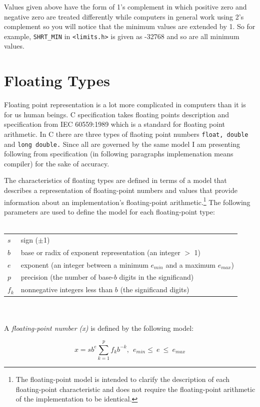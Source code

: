 Values given above have the form of 1's complement in which positive zero and
negative zero are treated differently while computers in general work using 2's
complement so you will notice that the minimum values are extended by 1. So for
example, \texttt{SHRT\_MIN} in \texttt{<limits.h>} is given as -32768 and so
are all minimum values.

\section{Floating Types}
Floating point representation is a lot more complicated in computers than it
is for us human beings. C specification takes floating points description and
specification from IEC 60559:1989 which is a standard for floating point
arithmetic. In C there are three types of flaoting point numbers \texttt{float,
double} and \texttt{long double.} Since all are governed by the same model I am
presenting following from specification (in following paragraphs implemenation
means compiler) for the sake of accuracy.

The characteristics of floating types are defined in terms of a model that
describes a representation of floating-point numbers and values that provide
information about an implementation's floating-point arithmetic.\footnote{The
  floating-point model is intended to clarify the description of each
  floating-point characteristic and does not require the floating-point
  arithmetic of the implementation to be identical.} The following parameters
are used to define the model for each floating-point type:
\\\\
\hspace*{1cm}\begin{tabular}{ll}
$s$&sign ($\pm$1)\\
$b$&base or radix of exponent representation (an integer $>$ 1)\\
$e$&exponent (an integer between a minimum $e_{min}$ and a maximum $e_{max}$)\\
$p$&precision (the number of base-$b$ digits in the significand)\\
$f_k$&nonnegative integers less than $b$ (the significand digits)
\end{tabular}
\\\\
A \textit{floating-point number (x)} is defined by the following model:

$$x = sb^e\sum_{k=1}^pf_kb^{-k},~~e_{min}\le~e~\le~e_{max}$$

